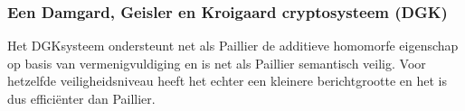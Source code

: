 \subsubsection{Een Damgard, Geisler en Kroigaard cryptosysteem (DGK)}
\label{dgk}
Het DGKsysteem ondersteunt net als Paillier de additieve homomorfe eigenschap op basis van vermenigvuldiging en is net als Paillier semantisch veilig. Voor hetzelfde veiligheidsniveau heeft het echter een kleinere berichtgrootte en het is dus effici\"enter dan Paillier.